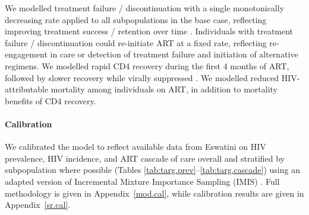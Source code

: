 We modelled treatment failure / discontinuation with a single monotonically decreasing rate
applied to all subpopulations in the base case,
reflecting improving treatment success / retention over time \cite{NERCHA2014nsf}.
Individuals with treatment failure / discontinuation could re-initiate ART at a fixed rate,
reflecting re-engagement in care or detection of treatment failure and initiation of alternative regimens.
We modelled rapid CD4 recovery during the first 4 months of ART,
followed by slower recovery while virally suppressed \cite{Battegay2006,Lawn2006,Gabillard2013}.
We modelled reduced HIV-attributable mortality among individuals on ART,
in addition to mortality benefits of CD4 recovery.
\paragraph{Calibration}
We calibrated the model to reflect
available data from Eswatini on HIV prevalence, HIV incidence, and ART cascade of care
overall and stratified by subpopulation where possible
(Tables \ref{tab:targ.prev}--\ref{tab:targ.cascade})
\cite{SDHS2006,SHIMS1,SHIMS2,SHIMS3,Baral2014,EswKP2014,EswIBBS2022}
using an adapted version of Incremental Mixture Importance Sampling (IMIS) \cite{Raftery2010}.
Full methodology is given in Appendix~\ref{mod.cal},
while calibration results are given in Appendix~\ref{sr.cal}.
